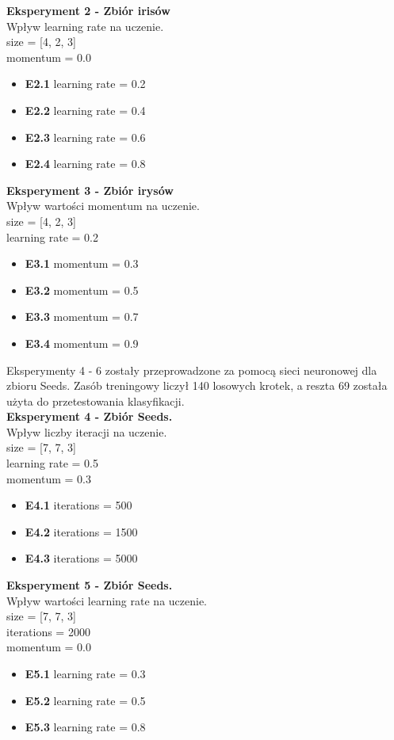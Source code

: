 \documentclass{classrep}
\begin{document}
	\textbf{Eksperyment 2 - Zbiór irisów}\\
		Wpływ learning rate na uczenie.\\
		size = [4, 2, 3]\\
		momentum =  0.0
		\begin{itemize}
			\item \textbf{E2.1}
			 learning rate = 0.2
			\item \textbf{E2.2} 
			learning rate = 0.4
			\item \textbf{E2.3}
			learning rate = 0.6
			\item \textbf{E2.4}
			learning rate = 0.8\\
		\end{itemize}
	
	\textbf{Eksperyment 3 - Zbiór irysów}\\
		Wpływ wartości momentum na uczenie.\\
		size = [4, 2, 3]\\
		learning rate = 0.2
		\begin{itemize}
			\item \textbf{E3.1}
			 momentum = 0.3
			\item \textbf{E3.2} 
			momentum = 0.5
			\item \textbf{E3.3}
			momentum = 0.7
			\item \textbf{E3.4}
			momentum = 0.9\\
		\end{itemize}

Eksperymenty 4 - 6 zostały przeprowadzone za pomocą sieci neuronowej dla zbioru Seeds. Zasób treningowy liczył 140 losowych krotek, a reszta 69 została użyta do przetestowania klasyfikacji. \\


	\textbf{Eksperyment 4 - Zbiór Seeds.}\\
		Wpływ liczby iteracji na uczenie.\\
		size = [7, 7, 3]\\
		learning rate = 0.5\\
		momentum = 0.3
		\begin{itemize}
			\item \textbf{E4.1}
			 iterations = 500
			\item \textbf{E4.2} 
			iterations = 1500
			\item \textbf{E4.3}
			iterations = 5000\\
		\end{itemize}

\textbf{Eksperyment 5 - Zbiór Seeds.}\\
		Wpływ wartości learning rate na uczenie.\\
		size = [7, 7, 3]\\
		iterations = 2000\\
		momentum = 0.0
		\begin{itemize}
			\item \textbf{E5.1}
			 learning rate = 0.3
			\item \textbf{E5.2} 
			learning rate = 0.5
			\item \textbf{E5.3}
			learning rate = 0.8\\
		\end{itemize}
\end{document}
